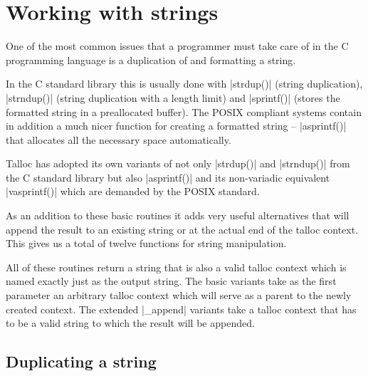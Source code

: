 \section{Working with strings}
\label{talloc:sec:strings}

One of the most common issues that a programmer must take care of in the C
programming language is a duplication of and formatting a string.

In the C standard library this is usually done with |strdup()| (string
duplication), |strndup()| (string duplication with a length limit) and
|sprintf()| (stores the formatted string in a preallocated buffer). The POSIX
compliant systems contain in addition a much nicer function for creating a
formatted string -- |asprintf()| that allocates all the necessary space
automatically.

Talloc has adopted its own variants of not only |strdup()| and |strndup()| from
the C standard library but also |asprintf()| and its non-variadic
equivalent |vasprintf()| which are demanded by the POSIX standard.

As an addition to these basic routines it adds very useful alternatives that
will append the result to an existing string or at the actual end of the talloc
context. This gives us a total of twelve functions for string manipulation.

All of these routines return a string that is also a valid talloc context
which is named exactly just as the output string. The basic variants take as
the first parameter an arbitrary talloc context which will serve as a parent to
the newly created context. The extended |_append| variants take a talloc context
that has to be a valid string to which the result will be appended.

\subsection{Duplicating a string}

